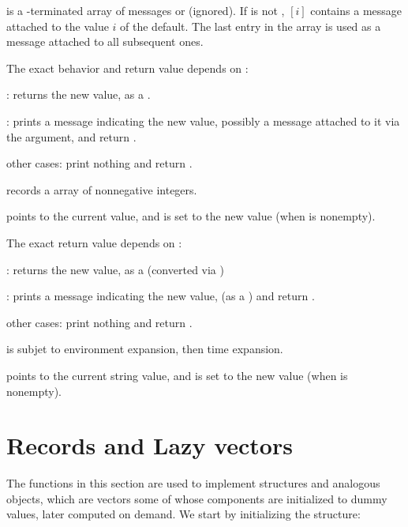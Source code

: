 \item {} is a \kbd[NULL]-terminated array of messages or 
(ignored). If  is not , $[i]$ contains
a message attached to the value $i$ of the default. The last entry in the
 array is used as a message attached to all subsequent ones.

The exact behavior and return value depends on :

\item {}: returns the new value, as a .

\item {}: prints a message indicating the new value,
possibly a message attached to it via the  argument, and return
.

\item other cases: print nothing and return .


\item records a  array of nonnegative integers.

\item {} points to the current  value, and is set to the
new value (when  is nonempty).

The exact return value depends on :

\item {}: returns the new value, as a  (converted via
)

\item {}: prints a message indicating the new value,
(as a ) and return .

\item other cases: print nothing and return .

\item {} is subjet to environment expansion, then time expansion.

\item {} points to the current string value, and is set to the new
value (when  is nonempty).

\section{Records and Lazy vectors}
The functions in this section are used to implement  structures and
analogous objects, which are vectors some of whose components are initialized
to dummy values, later computed on demand. We start by initializing the
structure:

